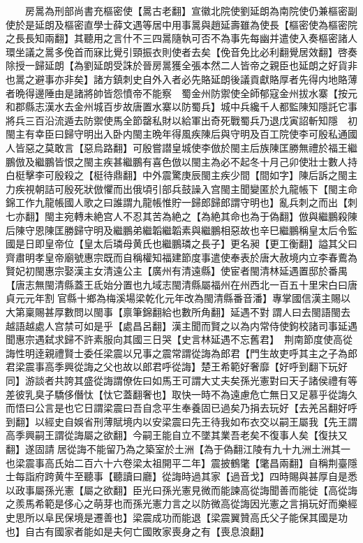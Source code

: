 　　房暠為刑部尚書充樞密使【暠古老翻】宣徽北院使劉延朗為南院使仍兼樞密副使於是延朗及樞密直學士薛文遇等居中用事暠與趙延壽雖為使長【樞密使為樞密院之長長知兩翻】其聽用之言什不三四暠隨執可否不為事先每幽并遣使入奏樞密諸人環坐議之暠多俛首而寐比覺引頸振衣則使者去矣【俛音免比必利翻覺居效翻】啓奏除授一歸延朗【為劉延朗受誅於晉房暠獲全張本然二人皆帝之親臣也延朗之好貨非也暠之避事亦非矣】諸方鎮刺史自外入者必先賂延朗後議貢獻賂厚者先得内地賂薄者晩得邊陲由是諸將帥皆怨憤帝不能察　蜀金州防禦使全師郁寇金州拔水寨【按元和郡縣志漢水去金州城百步故唐置水寨以防蜀兵】城中兵纔千人都監陳知隱託它事將兵三百沿流遁去防禦使馬全節罄私財以給軍出奇死戰蜀兵乃退戊寅詔斬知隱　初閩主有幸臣曰歸守明出入卧内閩主晩年得風疾陳后與守明及百工院使李可殷私通國人皆惡之莫敢言【惡烏路翻】可殷嘗譛皇城使李倣於閩主后族陳匡勝無禮於福王繼鵬倣及繼鵬皆恨之閩主疾甚繼鵬有喜色倣以閩主為必不起冬十月己卯使壯士數人持白梃擊李可殷殺之【梃待鼎翻】中外震驚庚辰閩主疾少間【間如字】陳后訴之閩主力疾視朝詰可殷死狀倣懼而出俄頃引部兵鼓譟入宫閩主聞變匿於九龍帳下【閩主命錦工作九龍帳國人歌之曰誰謂九龍帳惟貯一歸郎歸郎謂守明也】亂兵刺之而出【刺七亦翻】閩主宛轉未絶宫人不忍其苦為絶之【為絶其命也為于偽翻】倣與繼鵬殺陳后陳守恩陳匡勝歸守明及繼鵬弟繼韜繼韜素與繼鵬相惡故也辛巳繼鵬稱皇太后令監國是日即皇帝位【皇太后璘母黄氏也繼鵬璘之長子】更名昶【更工衡翻】謚其父曰齊肅明孝皇帝廟號惠宗既而自稱權知福建節度事遣使奉表於唐大赦境内立李春鷰為賢妃初閩惠宗娶漢主女清遠公主【廣州有清遠縣】使宦者閩清林延遇置邸於番禺【唐志無閩清縣蓋王氐始分置也九域志閩清縣屬福州在州西北一百五十里宋白曰唐貞元元年割官縣十鄉為梅溪場梁乾化元年改為閩清縣番音潘】專掌國信漢主賜以大第稟賜甚厚數問以閩事【禀筆錦翻給也數所角翻】延遇不對謂人曰去閩語閩去越語越處人宫禁可如是乎【處昌呂翻】漢主聞而賢之以為内常侍使鉤校諸司事延遇聞惠宗遇弑求歸不許素服向其國三日哭【史言林延遇不忘舊君】　荆南節度使高從誨性明逹親禮賢士委任梁震以兄事之震常謂從誨為郎君【門生故吏呼其主之子為郎君梁震事高季興從誨之父也故以郎君呼從誨】楚王希範好奢靡【好呼到翻下玩好同】游談者共誇其盛從誨謂僚佐曰如馬王可謂大丈夫矣孫光憲對曰天子諸侯禮有等差彼乳臭子驕侈僭忲【忲它蓋翻奢也】取快一時不為遠慮危亡無日又足慕乎從誨久而悟曰公言是也它日謂梁震曰吾自念平生奉養固已過矣乃捐去玩好【去羌呂翻好呼到翻】以經史自娛省刑薄賦境内以安梁震曰先王待我如布衣交以嗣王屬我【先王謂高季興嗣王謂從誨屬之欲翻】今嗣王能自立不墜其業吾老矣不復事人矣【復扶又翻】遂固請居從誨不能留乃為之築室於土洲【為于偽翻江陵有九十九洲土洲其一也梁震事高氏始二百六十六卷梁太祖開平二年】震披鶴氅【氅昌兩翻】自稱荆臺隱士每詣府跨黄牛至聽事【聽讀曰廳】從誨時過其家【過音戈】四時賜與甚厚自是悉以政事屬孫光憲【屬之欲翻】臣光曰孫光憲見微而能諫高從誨聞善而能徙【高從誨之羨馬希範是侈心之萌芽也而孫光憲力言之以防微高從誨因光憲之言捐玩好而樂經史思所以阜民保境是遷善也】梁震成功而能退【梁震翼贊高氏父子能保其國是功也】自古有國家者能如是夫何亡國敗家喪身之有【喪息浪翻】

